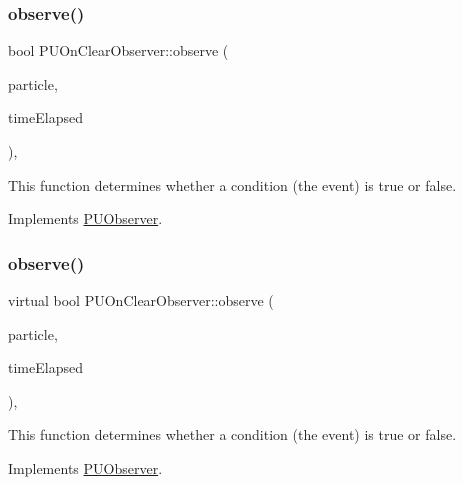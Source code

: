 \subsubsection{\texorpdfstring{observe()}{observe()}\hspace{0.1cm}{\footnotesize\ttfamily [1/2]}}
{\footnotesize\ttfamily bool P\+U\+On\+Clear\+Observer\+::observe (\begin{DoxyParamCaption}\item[{\hyperlink{structPUParticle3D}{P\+U\+Particle3D} $\ast$}]{particle,  }\item[{float}]{time\+Elapsed }\end{DoxyParamCaption})\hspace{0.3cm}{\ttfamily [override]}, {\ttfamily [virtual]}}

This function determines whether a condition (the event) is true or false. 

Implements \hyperlink{classPUObserver_a50f59cc3245e291b641463db5d3037f7}{P\+U\+Observer}.

\mbox{\label{classPUOnClearObserver_ac6c19fab71428b5c01df6e39955fa7fd}} 
\subsubsection{\texorpdfstring{observe()}{observe()}\hspace{0.1cm}{\footnotesize\ttfamily [2/2]}}
{\footnotesize\ttfamily virtual bool P\+U\+On\+Clear\+Observer\+::observe (\begin{DoxyParamCaption}\item[{\hyperlink{structPUParticle3D}{P\+U\+Particle3D} $\ast$}]{particle,  }\item[{float}]{time\+Elapsed }\end{DoxyParamCaption})\hspace{0.3cm}{\ttfamily [override]}, {\ttfamily [virtual]}}

This function determines whether a condition (the event) is true or false. 

Implements \hyperlink{classPUObserver_a50f59cc3245e291b641463db5d3037f7}{P\+U\+Observer}.

\mbox{\label{classPUOnClearObserver_ac6970028b94d011a9b3d1aa3b971acf5}} 
